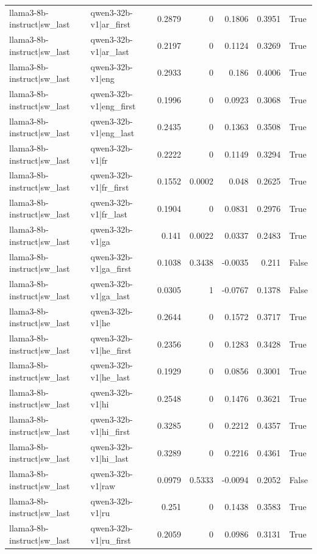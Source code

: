 \begin{table}
\begin{tabular}{l l r r r r l}
llama3-8b-instruct|sw_last & qwen3-32b-v1|ar_first & 0.2879 & 0 & 0.1806 & 0.3951 & True \\
llama3-8b-instruct|sw_last & qwen3-32b-v1|ar_last & 0.2197 & 0 & 0.1124 & 0.3269 & True \\
llama3-8b-instruct|sw_last & qwen3-32b-v1|eng & 0.2933 & 0 & 0.186 & 0.4006 & True \\
llama3-8b-instruct|sw_last & qwen3-32b-v1|eng_first & 0.1996 & 0 & 0.0923 & 0.3068 & True \\
llama3-8b-instruct|sw_last & qwen3-32b-v1|eng_last & 0.2435 & 0 & 0.1363 & 0.3508 & True \\
llama3-8b-instruct|sw_last & qwen3-32b-v1|fr & 0.2222 & 0 & 0.1149 & 0.3294 & True \\
llama3-8b-instruct|sw_last & qwen3-32b-v1|fr_first & 0.1552 & 0.0002 & 0.048 & 0.2625 & True \\
llama3-8b-instruct|sw_last & qwen3-32b-v1|fr_last & 0.1904 & 0 & 0.0831 & 0.2976 & True \\
llama3-8b-instruct|sw_last & qwen3-32b-v1|ga & 0.141 & 0.0022 & 0.0337 & 0.2483 & True \\
llama3-8b-instruct|sw_last & qwen3-32b-v1|ga_first & 0.1038 & 0.3438 & -0.0035 & 0.211 & False \\
llama3-8b-instruct|sw_last & qwen3-32b-v1|ga_last & 0.0305 & 1 & -0.0767 & 0.1378 & False \\
llama3-8b-instruct|sw_last & qwen3-32b-v1|he & 0.2644 & 0 & 0.1572 & 0.3717 & True \\
llama3-8b-instruct|sw_last & qwen3-32b-v1|he_first & 0.2356 & 0 & 0.1283 & 0.3428 & True \\
llama3-8b-instruct|sw_last & qwen3-32b-v1|he_last & 0.1929 & 0 & 0.0856 & 0.3001 & True \\
llama3-8b-instruct|sw_last & qwen3-32b-v1|hi & 0.2548 & 0 & 0.1476 & 0.3621 & True \\
llama3-8b-instruct|sw_last & qwen3-32b-v1|hi_first & 0.3285 & 0 & 0.2212 & 0.4357 & True \\
llama3-8b-instruct|sw_last & qwen3-32b-v1|hi_last & 0.3289 & 0 & 0.2216 & 0.4361 & True \\
llama3-8b-instruct|sw_last & qwen3-32b-v1|raw & 0.0979 & 0.5333 & -0.0094 & 0.2052 & False \\
llama3-8b-instruct|sw_last & qwen3-32b-v1|ru & 0.251 & 0 & 0.1438 & 0.3583 & True \\
llama3-8b-instruct|sw_last & qwen3-32b-v1|ru_first & 0.2059 & 0 & 0.0986 & 0.3131 & True \\

\end{tabular}
\end{table}
